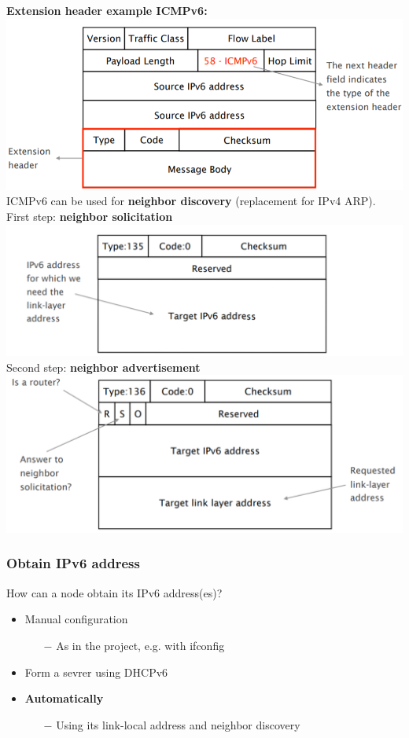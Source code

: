 \documentclass[a4paper, fontsize=8pt, landscape, DIV=1]{scrartcl}
\begin{document}
\begin{multicols*}{4}
		\textbf{Extension header example ICMPv6:}\\
		\includegraphics[width=\columnwidth]{images/Network_Layer/v6_extension_header.png}
		ICMPv6 can be used for \textbf{neighbor discovery} (replacement for IPv4
		ARP).\\
		First step: \textbf{neighbor solicitation}\\
		\includegraphics[width=\columnwidth]{images/Network_Layer/v6_ICMP.png}
		Second step: \textbf{neighbor advertisement}\\
		\includegraphics[width=\columnwidth]{images/Network_Layer/v6_ICMP_2.png} 	 
		
		\subsubsection{Obtain IPv6 address}
		How can a node obtain its IPv6 address(es)?
		\begin{itemize}[noitemsep]
			\item Manual configuration
			\begin{itemize}
				\item[$-$] As in the project, e.g. with ifconfig
			\end{itemize}
			\item Form a sevrer using DHCPv6
			\item \textbf{Automatically}
			\begin{itemize}
				\item[$-$] Using its link-local address and neighbor discovery
			\end{itemize}
		\end{itemize}
		

\end{multicols*}
\end{document}
